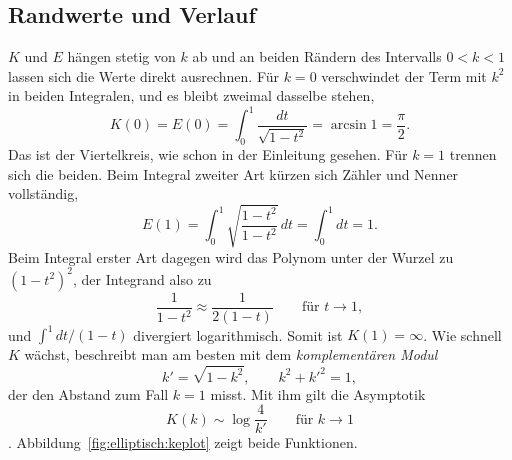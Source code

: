 \subsection{Randwerte und Verlauf}
$K$ und $E$ hängen stetig von $k$ ab und an beiden Rändern des
Intervalls $0 < k < 1$ lassen sich die Werte direkt ausrechnen.
Für $k = 0$ verschwindet der Term mit $k^2$ in beiden Integralen,
und es bleibt zweimal dasselbe stehen,
\begin{equation}
K(0)
=
E(0)
=
\int_0^1 \frac{dt}{\sqrt{1-t^2}}
=
\arcsin 1
=
\frac{\pi}{2}.
\label{elliptisch:equation:randnull}
\end{equation}
Das ist der Viertelkreis, wie schon in der Einleitung gesehen.
Für $k = 1$ trennen sich die beiden.
Beim Integral zweiter Art kürzen sich Zähler und Nenner vollständig,
\begin{equation}
E(1)
=
\int_0^1 \sqrt{\frac{1-t^2}{1-t^2}}\,dt
=
\int_0^1 dt
=
1.
\label{elliptisch:equation:randeins}
\end{equation}
Beim Integral erster Art dagegen wird das Polynom unter der Wurzel
zu $(1-t^2)^2$, der Integrand also zu
\begin{equation}
\frac{1}{1-t^2}
\approx
\frac{1}{2(1-t)}
\qquad
\text{für } t \to 1,
\label{elliptisch:equation:kdivergenz}
\end{equation}
und $\int^1 dt/(1-t)$ divergiert logarithmisch.
Somit ist $K(1) = \infty$.
Wie schnell $K$ wächst, beschreibt man am besten mit dem
\emph{komplementären Modul}
\begin{equation}
k' = \sqrt{1-k^2},
\qquad
k^2 + k'^2 = 1,
\label{elliptisch:equation:kstrich}
\end{equation}
%
der den Abstand zum Fall $k = 1$ misst.
Mit ihm gilt die Asymptotik
\begin{equation}
K(k)
\sim
\log \frac{4}{k'}
\qquad
\text{für } k \to 1
\label{elliptisch:equation:kasymptotik}
\end{equation}
\cite[Abschnitt~11.1]{elliptisch:mueller-spezielle}.
Abbildung~\ref{fig:elliptisch:keplot} zeigt beide Funktionen.


